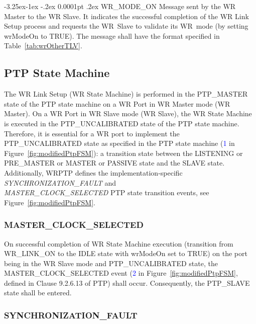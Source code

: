 \documentclass[a4paper, 12pt]{article}
\makeatletter
\renewcommand\paragraph{\@startsection{paragraph}{4}{\z@}%
                                     {-3.25ex\@plus -1ex \@minus -.2ex}%
                                     {0.0001pt \@plus .2ex}%
                                     {\normalfont\normalsize\bfseries}}
\makeatother
\begin{document}
\paragraph{WR\_MODE\_ON} Message sent by the WR Master to the WR Slave. It indicates the successful completion 
of the WR Link Setup process and requests the WR~Slave to validate its WR~mode (by setting wrModeOn 
to TRUE). The message shall have the format specified in Table~\ref{tab:wrOtherTLV}.

\newpage

\subsection{PTP State Machine}
\label{ptpStateMachine}

The WR Link Setup (WR State Machine) is performed in the PTP\_MASTER state of the PTP state machine 
on a WR Port in WR Master mode (WR Master). On a WR Port in WR Slave mode (WR Slave), 
the WR State Machine is executed in the PTP\_UNCALIBRATED state of the PTP state machine. 
Therefore, it is essential for a WR port to implement the PTP\_UNCALIBRATED state as specified in the 
PTP state machine (\textcolor{blue}{1} in Figure~\ref{fig:modifiedPtpFSM}): a transition state 
between the  LISTENING or PRE\_MASTER or MASTER or PASSIVE state and the SLAVE state.
Additionally, WRPTP defines the implementation-specific \textit{SYNCHRONIZATION\_FAULT} and  \\
\textit{MASTER\_CLOCK\_SELECTED} PTP state transition events, see Figure~\ref{fig:modifiedPtpFSM}.


\subsubsection{MASTER\_CLOCK\_SELECTED}
\label{sec:masterClockSelected}

On successful completion of WR State Machine execution (transition from WR\_LINK\_ON to the IDLE 
state with wrModeOn set to TRUE) on the port being in the WR Slave mode and PTP\_UNCALIBRATED state, 
the MASTER\_CLOCK\_SELECTED event (\textcolor{blue}{2} in Figure~\ref{fig:modifiedPtpFSM}, 
defined in Clause 9.2.6.13 of PTP) shall occur. Consequently, the PTP\_SLAVE state shall be 
entered.

\subsubsection{SYNCHRONIZATION\_FAULT}
\label{sec:synchronizationFault}
\end{document}
